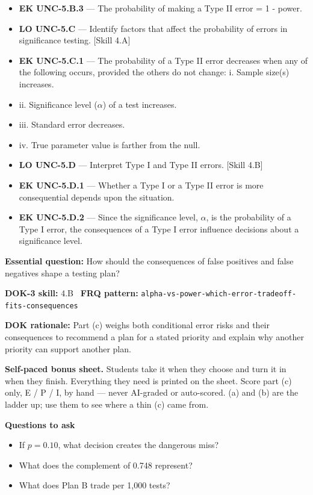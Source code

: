 \documentclass[11pt]{article}
\begin{document}
{\begin{itemize}[leftmargin=1.5em,itemsep=2pt,topsep=2pt]
  \item \textbf{EK UNC-5.B.3} --- The probability of making a Type II error = 1 - power.
  \item \textbf{LO UNC-5.C} --- Identify factors that affect the probability of errors in significance testing. [Skill 4.A]
  \item \textbf{EK UNC-5.C.1} --- The probability of a Type II error decreases when any of the following occurs, provided the others do not change: i. Sample size(s) increases.
  \item ii. Significance level ($\alpha$) of a test increases.
  \item iii. Standard error decreases.
  \item iv. True parameter value is farther from the null.
  \item \textbf{LO UNC-5.D} --- Interpret Type I and Type II errors. [Skill 4.B]
  \item \textbf{EK UNC-5.D.1} --- Whether a Type I or a Type II error is more consequential depends upon the situation.
  \item \textbf{EK UNC-5.D.2} --- Since the significance level, $\alpha$, is the probability of a Type I error, the consequences of a Type I error influence decisions about a significance level.
\end{itemize}
}
\textbf{Essential question:} How should the consequences of false positives and false negatives shape a testing plan?\par
\textbf{DOK-3 skill:} 4.B \textperiodcentered\ \textbf{FRQ pattern:} {\small\texttt{alpha-\allowbreak{}vs-\allowbreak{}power-\allowbreak{}which-\allowbreak{}error-\allowbreak{}tradeoff-\allowbreak{}fits-\allowbreak{}consequences}}\par
\textbf{DOK rationale:} Part (c) weighs both conditional error risks and their consequences to recommend a plan for a stated priority and explain why another priority can support another plan.\par

\textbf{Self-paced bonus sheet.} Students take it when they choose and turn it in when they finish. Everything they need is printed on the sheet. Score part (c) only, E / P / I, by hand --- never AI-graded or auto-scored. (a) and (b) are the ladder up; use them to see where a thin (c) came from.\par

\textbf{Questions to ask}
\begin{itemize}[leftmargin=1.5em,itemsep=2pt,topsep=2pt]
  \item If $p=0.10$, what decision creates the dangerous miss?
  \item What does the complement of 0.748 represent?
  \item What does Plan B trade per 1,000 tests?
\end{itemize}
\end{document}
